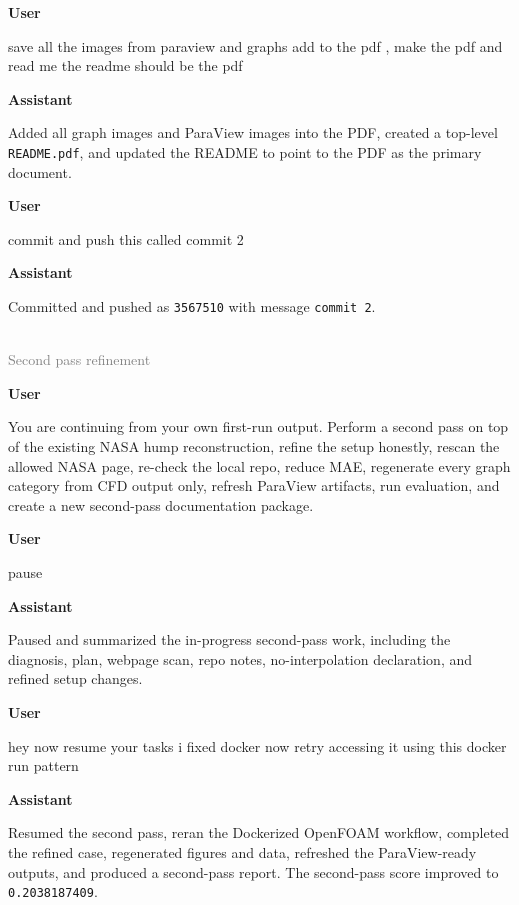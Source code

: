 \documentclass[11pt]{article}
\newcommand{\turnheader}[2]{
  \vspace{0.8em}
  \noindent{\large\textbf{#1}}\\
  \noindent\textcolor{gray}{#2}
  \vspace{0.35em}
}
\newenvironment{chatuser}
  {\par\noindent\color{userblue}\textbf{User}\par\noindent\begin{minipage}{\linewidth}\raggedright}
  {\end{minipage}\par}
\newenvironment{chatassistant}
  {\par\noindent\color{assistantgreen}\textbf{Assistant}\par\noindent\begin{minipage}{\linewidth}\raggedright}
  {\end{minipage}\par}
\begin{document}
\begin{chatuser}
save all the images from paraview and graphs add to the pdf , make the pdf and read me the readme should be the pdf
\end{chatuser}

\begin{chatassistant}
Added all graph images and ParaView images into the PDF, created a top-level \texttt{README.pdf}, and updated the README to point to the PDF as the primary document.
\end{chatassistant}

\begin{chatuser}
commit and push this called commit 2
\end{chatuser}

\begin{chatassistant}
Committed and pushed as \texttt{3567510} with message \texttt{commit 2}.
\end{chatassistant}

\turnheader{Turn 5}{Second pass refinement}
\begin{chatuser}
You are continuing from your own first-run output. Perform a second pass on top of the existing NASA hump reconstruction, refine the setup honestly, rescan the allowed NASA page, re-check the local repo, reduce MAE, regenerate every graph category from CFD output only, refresh ParaView artifacts, run evaluation, and create a new second-pass documentation package.
\end{chatuser}

\begin{chatuser}
pause
\end{chatuser}

\begin{chatassistant}
Paused and summarized the in-progress second-pass work, including the diagnosis, plan, webpage scan, repo notes, no-interpolation declaration, and refined setup changes.
\end{chatassistant}

\begin{chatuser}
hey now resume your tasks i fixed docker now retry accessing it using this docker run pattern
\end{chatuser}

\begin{chatassistant}
Resumed the second pass, reran the Dockerized OpenFOAM workflow, completed the refined case, regenerated figures and data, refreshed the ParaView-ready outputs, and produced a second-pass report. The second-pass score improved to \texttt{0.2038187409}.
\end{chatassistant}
\end{document}
